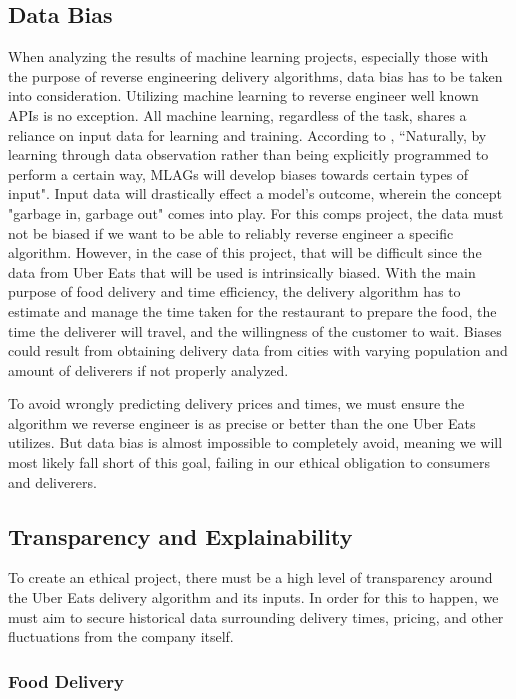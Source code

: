 \documentclass[10pt,twocolumn]{article}
\begin{document}
\subsection{Data Bias}

When analyzing the results of machine learning projects, especially those with the purpose of reverse engineering delivery algorithms, data bias has to be taken into consideration. Utilizing machine learning to reverse engineer well known APIs is no exception. All machine learning, regardless of the task, shares a reliance on input data for learning and training. According to , ``Naturally, by learning through data observation rather than being explicitly programmed to perform a certain way, MLAGs will develop biases towards certain types of input". Input data will drastically effect a model's outcome, wherein the concept "garbage in, garbage out" comes into play. For this comps project, the data must not be biased if we want to be able to reliably reverse engineer a specific algorithm. However, in the case of this project, that will be difficult since the data from Uber Eats that will be used is intrinsically biased. With the main purpose of food delivery and time efficiency, the delivery algorithm has to estimate and manage the time taken for the restaurant to prepare the food, the time the deliverer will travel, and the willingness of the customer to wait. Biases could result from obtaining delivery data from cities with varying population and amount of deliverers if not properly analyzed.

To avoid wrongly predicting delivery prices and times, we must ensure the algorithm we reverse engineer is as precise or better than the one Uber Eats utilizes. But data bias is almost impossible to completely avoid, meaning we will most likely fall short of this goal, failing in our ethical obligation to consumers and deliverers.

\subsection{Transparency and Explainability}

To create an ethical project, there must be a high level of transparency around the Uber Eats delivery algorithm and its inputs. In order for this to happen, we must aim to secure historical data surrounding delivery times, pricing, and other fluctuations from the company itself.

\subsubsection{Food Delivery}
\end{document}
